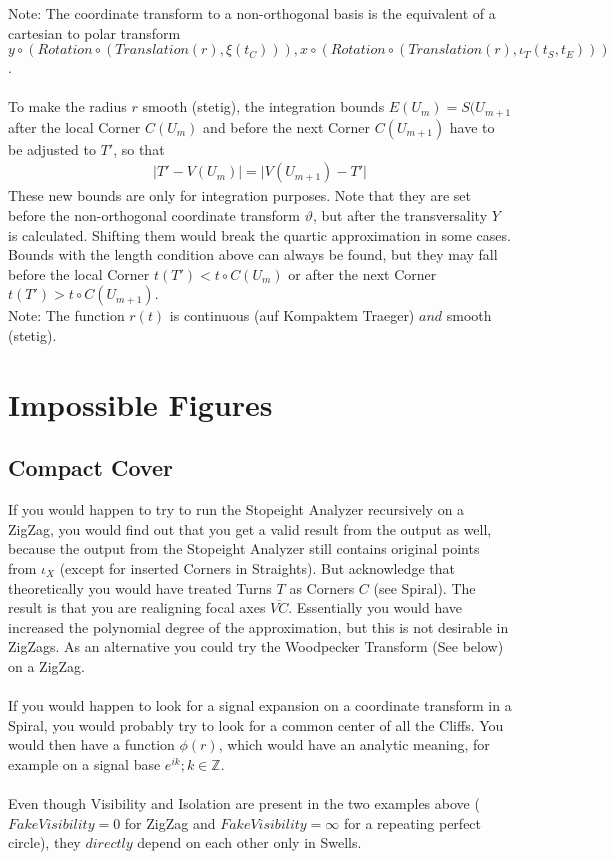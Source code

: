 \documentclass{report}
\begin{document}
Note: The coordinate transform to a non-orthogonal basis is the equivalent of a cartesian to polar transform $y\circ (Rotation\circ (Translation(r),\xi(t_{C}))),x\circ (Rotation\circ (Translation(r),\iota_{T}(t_{S},t_{E})))$.\\\\
To make the radius $r$ smooth (stetig), the integration bounds $E(U_{m})=S(U_{m+1}$ after the local Corner $C(U_{m})$ and before the next Corner $C(U_{m+1})$ have to be adjusted to $T'$, so that
\begin{align}
\lvert T' - V(U_{m}) \rvert = \lvert V(U_{m+1}) -T' \rvert\label{eq:2}
\end{align}
These new bounds are only for integration purposes. Note that they are set before the non-orthogonal coordinate transform $\vartheta$, but after the transversality $Y$ is calculated. Shifting them would break the quartic approximation in some cases.\\
Bounds with the length condition above can always be found, but they may fall before the local Corner $t(T') < t\circ C(U_{m})$ or after the next Corner $t(T') > t\circ C(U_{m+1})$.\\
Note: The function $r(t)$ is continuous (auf Kompaktem Traeger) $and$ smooth (stetig).

\section{Impossible Figures}

\subsection*{Compact Cover}
If you would happen to try to run the Stopeight Analyzer recursively on a ZigZag, you would find out that you get a valid result from the output as well, because the output from the Stopeight Analyzer still contains original points from $\iota_{X}$ (except for inserted Corners in Straights). But acknowledge that theoretically you would have treated Turns $T$ as Corners $C$ (see Spiral). The result is that you are realigning focal axes $\overline{VC}$. Essentially you would have increased the polynomial degree of the approximation, but this is not desirable in ZigZags. As an alternative you could try the Woodpecker Transform (See below) on a ZigZag.\\\\
If you would happen to look for a signal expansion on a coordinate transform in a Spiral, you would probably try to look for a common center of all the Cliffs. You would then have a function $\phi (r)$, which would have an analytic meaning, for example on a signal base $e^{ik};k \in \mathbb{Z}$.\\\\
Even though Visibility and Isolation are present in the two examples above ($Fake Visibility=0$ for ZigZag and $Fake Visibility=\infty$ for a repeating perfect circle), they $directly$ depend on each other only in Swells.
\end{document}
